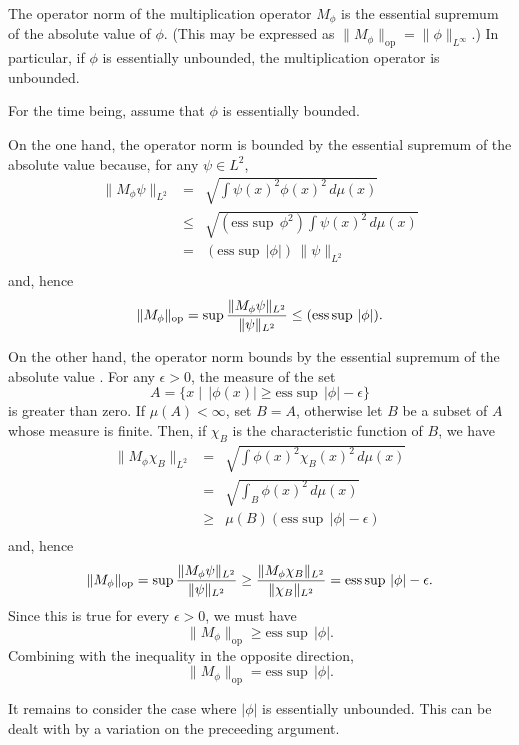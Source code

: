 \documentclass[12pt]{article}
\begin{document}
The operator norm of the multiplication operator $M_\phi$ is the
essential supremum of the absolute value of $\phi$.  (This may be 
expressed as $\| M_\phi \|_\mathrm{op} = \| \phi \|_{L^\infty}$.)
In particular, if $\phi$ is essentially unbounded, the multiplication 
operator is unbounded.

For the time being, assume that $\phi$ is essentially bounded.

On the one hand, the operator norm is bounded by the essential
supremum of the absolute value because, for any $\psi \in L^2$,
\begin{eqnarray*}
\| M_\phi \psi \|_{L^2} &=&  \sqrt{\int \psi(x)^2 \phi(x)^2 \,d\mu(x)} \\
&\le& \sqrt{ (\mathrm{ess } \sup\, \phi^2) \int \psi(x)^2 \,d\mu(x)} \\
&=&  (\mathrm{ess }\sup\, |\phi|)\,\| \psi\|_{L^2} \\
\end{eqnarray*}
and, hence
\[ \| M_\phi \|_\mathrm{op} = \sup {\| M_\phi \psi \|_{L^2} \over \| \psi
\|_{L^2}} \le (\mathrm{ess }\sup\,| \phi|).\]

On the other hand, the operator norm bounds by the essential supremum
of the absolute value .  For any $\epsilon > 0$, the measure of the
set
\[ A = \{ x \mid\,|\phi(x)| \ge \mathrm{ess }\sup\, |\phi| - \epsilon \} \]
is greater than zero.  If $\mu(A) < \infty$, set $B= A$, otherwise let
$B$ be a subset of $A$ whose measure is finite.  Then, if $\chi_B$ is
the characteristic function of $B$, we have
\begin{eqnarray*}
\| M_\phi \chi_B \|_{L^2} &=&  \sqrt{\int \phi(x)^2 \chi_B(x)^2
\,d\mu(x)} \\
&=& \sqrt{\int_B \phi(x)^2 \,d\mu(x)} \\
&\ge& \mu(B) (\mathrm{ess }\sup\, |\phi| - \epsilon)\\
\end{eqnarray*}
and, hence
\[ \| M_\phi \|_\mathrm{op} = \sup {\| M_\phi \psi \|_{L^2} \over \|
\psi \|_{L^2}} \ge {\| M_\phi \chi_B \|_{L^2} \over \| \chi_B
\|_{L^2}} = \mathrm{ess }\sup\, |\phi| - \epsilon.\]
Since this is true for every $\epsilon > 0$, we must have
\[ \| M_\phi \|_\mathrm{op} \ge \mathrm{ess }\sup\, |\phi|.\]
Combining with the inequality in the opposite direction,
\[ \| M_\phi \|_\mathrm{op} = \mathrm{ess }\sup\, |\phi|.\]

It remains to consider the case where $|\phi|$ is essentially
unbounded.  This can be dealt with by a variation on the preceeding
argument.
\end{document}
